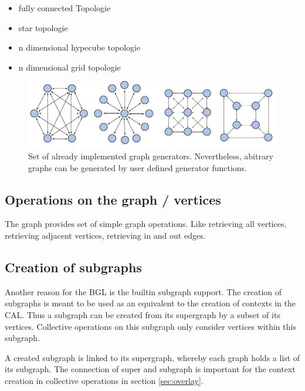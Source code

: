\begin{itemize}
\item fully connected Topologie
\item star topologie
\item n dimensional hypecube topologie
\item n dimensional grid topologie
\end{itemize}

\begin{figure}[H]
  \centering
  \includegraphics[width=\textwidth]{graphics/40_topologies}
  \caption{Set of already implemented graph generators. Nevertheless,
  abitrary graphs can be generated by user defined generator functions.}
  \label{fig:topologies}
\end{figure}



\subsection{Operations on the graph / vertices}
The graph provides set of simple graph operations. Like retrieving all
vertices, retrieving adjacent vertices, retrieving in and out edges.

\subsection{Creation of subgraphs}
Another reason for the BGL is the builtin subgraph support. The
creation of subgraphs is meant to be used as an equivalent to the
creation of contexts in the CAL. Thus a subgraph can be created from
its supergraph by a subset of its vertices. Collective operations on
this subgraph only consider vertices within this subgraph.

A created subgraph is linked to its supergraph, whereby each graph
holds a list of its subgraph. The connection of super and subgraph is
important for the context creation in collective operations in section
\ref{sec:overlay}.

